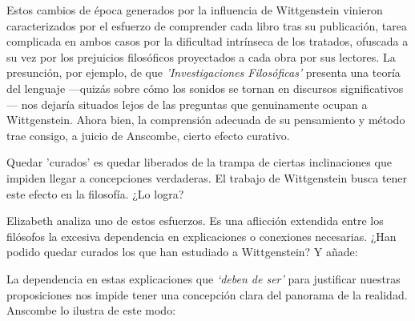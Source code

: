  Estos cambios de época generados por la influencia de Wittgenstein vinieron
 caracterizados por el esfuerzo de comprender cada libro tras su publicación,
 tarea complicada en ambos casos por la dificultad intrínseca de los tratados,
 ofuscada a su vez por los prejuicios filosóficos proyectados a cada obra por sus
 lectores. La presunción, por ejemplo, de que \emph{'Investigaciones
   Filosóficas'} presenta una teoría del lenguaje ---quizás sobre cómo los
 sonidos se tornan en discursos significativos--- nos dejaría situados lejos de
 las preguntas que genuinamente ocupan a
 Wittgenstein.\autocite[cf.~][p.~183]{anscombe2011plato:twocuts} Ahora bien, la comprensión
 adecuada de su pensamiento y método trae consigo, a juicio de Anscombe, cierto
 efecto curativo.

Quedar 'curados' es quedar liberados de la trampa de ciertas inclinaciones que
impiden llegar a concepciones verdaderas. El trabajo de Wittgenstein busca tener
este efecto en la filosofía. ¿Lo logra?

Elizabeth analiza uno de estos esfuerzos. Es una aflicción extendida entre los
filósofos la excesiva dependencia en explicaciones o conexiones necesarias. ¿Han
podido quedar curados los que han estudiado a Wittgenstein? Y añade:

La dependencia en estas explicaciones que \emph{`deben de ser'} para justificar
nuestras proposiciones nos impide tener una concepción clara del panorama de la
realidad. Anscombe lo ilustra de este modo:

